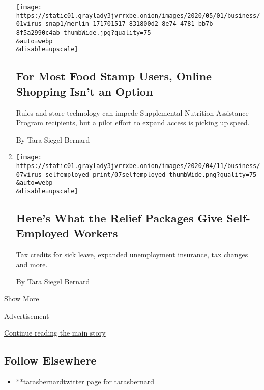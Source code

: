 \begin{enumerate}
  \texttt{[image: https://static01.graylady3jvrrxbe.onion/images/2020/05/01/business/01virus-snap1/merlin\_171701517\_831800d2-8e74-4781-bb7b-8f5a2990c4ab-thumbWide.jpg?quality=75\\\&auto=webp\\\&disable=upscale]}

  \hypertarget{for-most-food-stamp-users-online-shopping-isnt-an-option}{%
  \subsection{For Most Food Stamp Users, Online Shopping Isn't an
  Option}\label{for-most-food-stamp-users-online-shopping-isnt-an-option}}

  Rules and store technology can impede Supplemental Nutrition
  Assistance Program recipients, but a pilot effort to expand access is
  picking up speed.

  By Tara Siegel Bernard
\item
  \href{/article/self-employed-workers-unemployment-coronavirus-stimulus-package.html}{}

  \texttt{[image: https://static01.graylady3jvrrxbe.onion/images/2020/04/11/business/07virus-selfemployed-print/07selfemployed-thumbWide.png?quality=75\\\&auto=webp\\\&disable=upscale]}

  \hypertarget{heres-what-the-relief-packages-give-self-employed-workers}{%
  \subsection{Here's What the Relief Packages Give Self-Employed
  Workers}\label{heres-what-the-relief-packages-give-self-employed-workers}}

  Tax credits for sick leave, expanded unemployment insurance, tax
  changes and more.

  By Tara Siegel Bernard
\end{enumerate}

Show More

Advertisement

\protect\hyperlink{after-mid2}{Continue reading the main story}

\hypertarget{follow-elsewhere}{%
\subsection{Follow Elsewhere}\label{follow-elsewhere}}

\begin{itemize}
\tightlist
\item
  \href{https://twitter.com/tarasbernard}{**tarasbernardtwitter page for
  tarasbernard}
\end{itemize}

